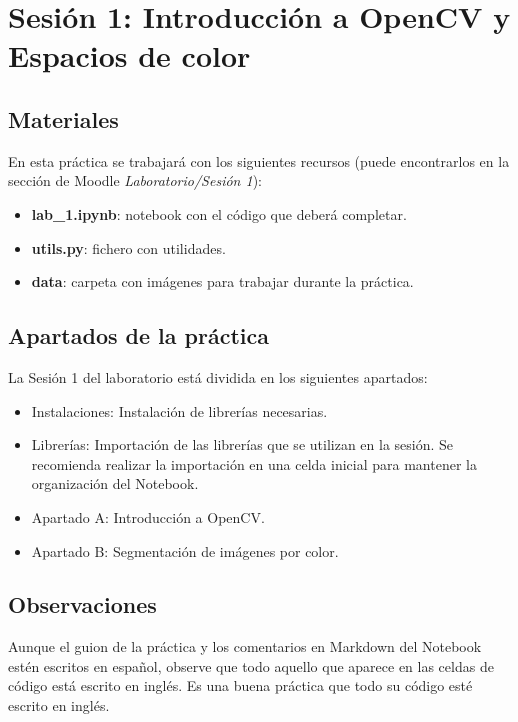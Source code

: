 \chapter{Sesión 1: Introducción a OpenCV y Espacios de color}
\label{chapter:introduction_ses_1}

\section{Materiales}

En esta práctica se trabajará con los siguientes recursos (puede encontrarlos en la sección de Moodle \textit{Laboratorio/Sesión 1}):

\begin{itemize}
    \item \textbf{lab\_1.ipynb}: notebook con el código que deberá completar.
    \item \textbf{utils.py}: fichero con utilidades.
    \item \textbf{data}: carpeta con imágenes para trabajar durante la práctica.
\end{itemize}

\section{Apartados de la práctica}

La Sesión 1 del laboratorio está dividida en los siguientes apartados:

\begin{itemize}
    \item Instalaciones: Instalación de librerías necesarias.
    \item Librerías: Importación de las librerías que se utilizan en la sesión. Se recomienda realizar la importación en una celda inicial para mantener la organización del Notebook.
    \item Apartado A: Introducción a OpenCV.
    \item Apartado B: Segmentación de imágenes por color.
    
\end{itemize}

\section{Observaciones}

Aunque el guion de la práctica y los comentarios en Markdown del Notebook estén escritos en español, observe que todo aquello que aparece en las celdas de código está escrito en inglés. Es una buena práctica que todo su código esté escrito en inglés.

